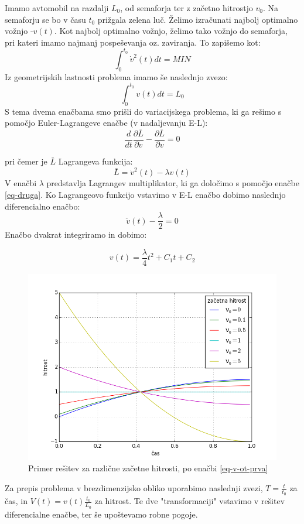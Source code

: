 \documentclass[11pt]{article}
\numberwithin{equation}{section} %
\numberwithin{table}{section} %
\begin{document}
Imamo avtomobil na razdalji $L_0$, od semaforja ter z začetno hitrostjo $v_0$. Na semaforju se bo v času $t_0$ prižgala 	zelena luč. Želimo izračunati najbolj optimalno vožnjo -$v(t)$. Kot najbolj optimalno vožnjo, želimo tako vožnjo do semaforja, pri kateri imamo najmanj pospeševanja oz. zaviranja. To zapišemo kot:
\begin{equation}
\label{eq-prva}
\int_{0}^{t_0} \dot{v}^2(t) dt = MIN
\end{equation}
Iz geometrijskih lastnosti problema imamo še naslednjo zvezo:
\begin{equation}
\label{eq-druga}
\int_{0}^{t_0} v(t) dt = L_0
\end{equation}
S tema dvema enačbama smo prišli do variacijskega problema, ki ga rešimo s pomočjo Euler-Lagrangeve enačbe (v nadaljevanju E-L):
\begin{equation}
\frac{d}{dt}\frac{\partial \bar L}{\partial \dot{v}}-\frac{\partial \bar L}{\partial v} = 0
\end{equation}

pri čemer je $ \bar L$ Lagrangeva funkcija:
\begin{equation}
\label{eq-lagrangeva-funkcija}
\bar L = \dot{v}^2(t)-\lambda v(t)
\end{equation}
V enačbi $\lambda$ predstavlja Lagrangev multiplikator, ki ga določimo s pomočjo enačbe \ref{eq-druga}. Ko Lagrangeovo funkcijo vstavimo v E-L enačbo dobimo naslednjo diferencialno enačbo:
\begin{equation}
\ddot{v}(t)-\frac{\lambda}{2}=0
\end{equation}
Enačbo dvakrat integriramo in dobimo:

\begin{equation}
\label{eq-osnovna}
v(t)=\frac{\lambda}{4}t^2+C_1 t+ C_2
\end{equation}
\begin{figure}[h]
\includegraphics[scale=0.55]{slike/prva.png}
\caption[skica-EPR]{Primer rešitev za različne začetne hitrosti, po enačbi \ref{eq-v-ot-prva}}
\label{fig:prva}
\end{figure}
Za prepis problema v brezdimenzijsko obliko uporabimo naslednji zvezi, $T=\frac{t}{t_0}$ za čas, in $V(t)=v(t)\frac{t_0}{L_0}$ za hitrost. Te dve "transformaciji" vstavimo v rešitev diferencialne enačbe, ter še upoštevamo robne pogoje.
\end{document}
